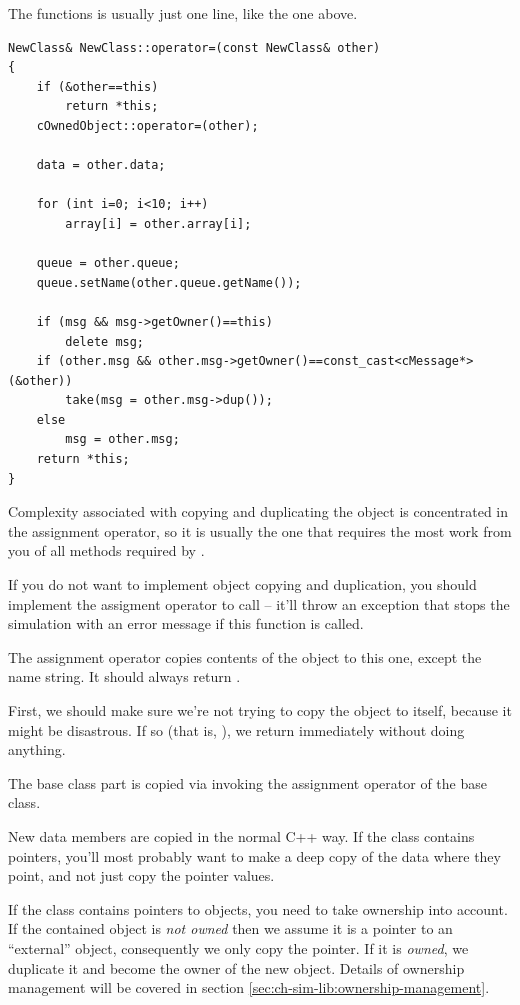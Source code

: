 The  functions is usually just one line, like the one above.

\begin{verbatim}
NewClass& NewClass::operator=(const NewClass& other)
{
    if (&other==this)
        return *this;
    cOwnedObject::operator=(other);

    data = other.data;

    for (int i=0; i<10; i++)
        array[i] = other.array[i];

    queue = other.queue;
    queue.setName(other.queue.getName());

    if (msg && msg->getOwner()==this)
        delete msg;
    if (other.msg && other.msg->getOwner()==const_cast<cMessage*>(&other))
        take(msg = other.msg->dup());
    else
        msg = other.msg;
    return *this;
}
\end{verbatim}

Complexity associated with copying and duplicating the object
is concentrated in the assignment operator, so it is usually
the one that requires the most work from you of all methods
required by .

If you do not want to implement object copying and duplication,
you should implement the assigment operator to call
 -- it'll throw an exception that
stops the simulation with an error message if this function
is called.

The assignment operator copies contents of the  object
to this one, except the name string. It should always return
.

First, we should make sure we're not trying to copy the object
to itself, because it might be disastrous. If so (that is,
), we return immediately without doing anything.

The base class part is copied via invoking the assignment operator of
the base class.

New data members are copied in the normal C++ way. If the class
contains pointers, you'll most probably want to make a deep copy of
the data where they point, and not just copy the pointer values.

If the class contains pointers to {\opp} objects, you need
to take ownership into account. If the contained object is \textit{not owned}
then we assume it is a pointer to an ``external'' object, consequently
we only copy the pointer. If it is \textit{owned}, we duplicate
it and become the owner of the new object. Details of ownership
management will be covered in section \ref{sec:ch-sim-lib:ownership-management}.


